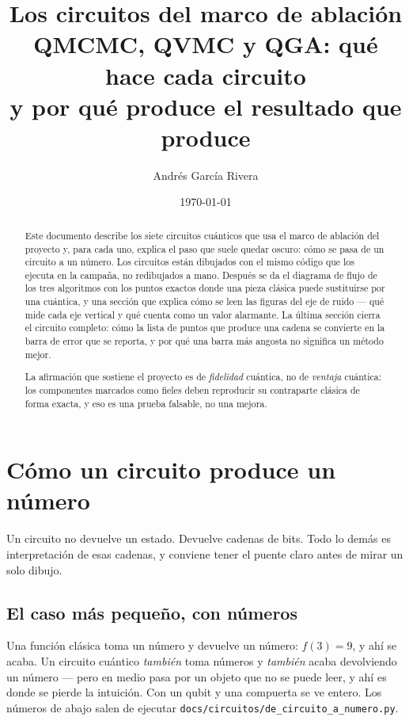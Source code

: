 \documentclass[11pt,a4paper]{article}
\title{\bfseries Los circuitos del marco de ablación\\[.3em]
  \large QMCMC, QVMC y QGA: qué hace cada circuito\\
  y por qué produce el resultado que produce}
\author{Andrés García Rivera}
\date{\today}
\begin{document}
\maketitle

\begin{abstract}
\noindent
Este documento describe los siete circuitos cuánticos que usa el marco de
ablación del proyecto y, para cada uno, explica el paso que suele quedar
oscuro: cómo se pasa de un circuito a un número. Los circuitos están
dibujados con el mismo código que los ejecuta en la campaña, no redibujados
a mano. Después se da el diagrama de flujo de los tres algoritmos con los
puntos exactos donde una pieza clásica puede sustituirse por una cuántica, y
una sección que explica cómo se leen las figuras del eje de ruido --- qué
mide cada eje vertical y qué cuenta como un valor alarmante. La última
sección cierra el circuito completo: cómo la lista de puntos que produce una
cadena se convierte en la barra de error que se reporta, y por qué una barra
más angosta no significa un método mejor.

\medskip\noindent
La afirmación que sostiene el proyecto es de \emph{fidelidad} cuántica, no de
\emph{ventaja} cuántica: los componentes marcados como fieles deben reproducir
su contraparte clásica de forma exacta, y eso es una prueba falsable, no una
mejora.
\end{abstract}

\tableofcontents
\bigskip

\section{Cómo un circuito produce un número}

Un circuito no devuelve un estado. Devuelve cadenas de bits. Todo lo demás
es interpretación de esas cadenas, y conviene tener el puente claro antes de
mirar un solo dibujo.

\subsection{El caso más pequeño, con números}
\label{sec:unqubit}

Una función clásica toma un número y devuelve un número:
$f(3) = 9$, y ahí se acaba. Un circuito cuántico \emph{también} toma números
y \emph{también} acaba devolviendo un número --- pero en medio pasa por un
objeto que no se puede leer, y ahí es donde se pierde la intuición. Con un
qubit y una compuerta se ve entero. Los números de abajo salen de ejecutar
\texttt{docs/circuitos/de\_circuito\_a\_numero.py}.
\end{document}
